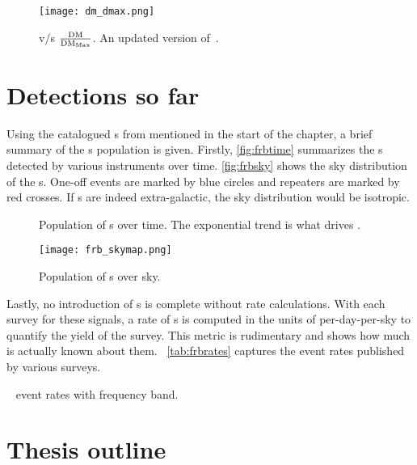 \begin{figure}
\label{fig:dmdmax}
	\centering
	\texttt{[image: dm\_dmax.png]}
\caption{\dm v/s $\frac{\rm DM}{{\rm DM}_{\rm Max}}$. An updated version of~\cite{petroff_survey, palfa_frb}.}
\end{figure}

\par 

\section{Detections so far}

\par Using the catalogued \frb{}s from  mentioned in the start of the chapter, a brief summary of the \frb{}s population is given.
Firstly, \autoref{fig:frbtime} summarizes the \frb{}s detected by various instruments over time. \autoref{fig:frbsky} shows the sky distribution of the \frb{}s. One-off events are marked by blue circles and repeaters are marked by red crosses. If \frb{}s are indeed extra-galactic, the sky distribution would be isotropic.

\begin{figure}
	\label{fig:frbtime}
	\caption{Population of \frb{}s over time. The exponential trend is what drives \vf.}
\end{figure}

\begin{figure}
	\label{fig:frbsky}
	\centering
	\texttt{[image: frb\_skymap.png]}
	\caption{Population of \frb{}s over sky. }
\end{figure}

\par Lastly, no introduction of \frb{}s is complete without rate calculations. With each survey for these signals, a rate of \frb{}s is computed in the units of per-day-per-sky to quantify the yield of the survey. This metric is rudimentary and shows how much is actually known about them. ~\autoref{tab:frbrates} captures the event rates published by various surveys.

\begin{table}
	\label{tab:frbrates}
	\caption{\frb{}~ event rates with frequency band.}

\end{table}

\section{Thesis outline}


